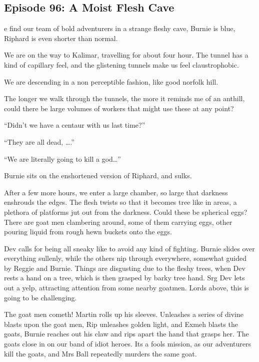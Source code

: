\subsection{Episode 96: A Moist Flesh Cave}

e find our team of bold adventurers in a strange fleshy cave, Burnie is blue, Riphard is even shorter than normal.\medskip

We are on the way to Kalimar, travelling for about four hour. The tunnel has a kind of capillary feel, and the glistening tunnels make us feel claustrophobic.\medskip

We are descending in a non perceptible fashion, like good norfolk hill.\medskip

The longer we walk through the tunnels, the more it reminds me of an anthill, could there be large volumes of workers that might use these at any point?\medskip

“Didn’t we have a centaur with us last time?”\medskip

“They are all dead, ….”\medskip

“We are literally going to kill a god…”\medskip

Burnie sits on the enshortened version of Riphard, and sulks.\medskip

After a few more hours, we enter a large chamber, so large that darkness enshrouds the edges. The flesh twists so that it becomes tree like in areas, a plethora of platforms jut out from the darkness. Could these be spherical eggs? There are goat men clambering around, some of them carrying eggs, other pouring liquid from rough hewn buckets onto the eggs.\medskip

Dev calls for being all sneaky like to avoid any kind of fighting. Burnie slides over everything sullenly, while the others nip through everywhere, somewhat guided by Reggie and Burnie. Things are disgusting due to the fleshy trees, when Dev rests a hand on a tree, which is then grasped by barky tree hand. Srg Dev lets out a yelp, attracting attention from some nearby goatmen. Lords above, this is going to be challenging.\medskip

The goat men cometh! Martin rolls up his sleeves. Unleashes a series of divine blasts upon the goat men, Rip unleashes golden light, and Exmeh blasts the goats, Burnie reaches out his claw and rips apart the hand that grasps her. The goats close in on our band of idiot heroes. Its a fools mission, as our adventurers kill the goats, and Mrs Ball repeatedly murders the same goat.\medskip

